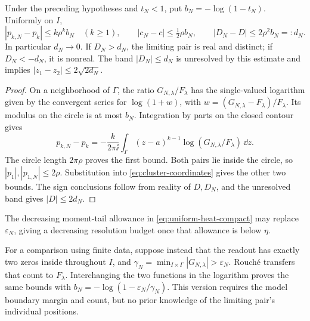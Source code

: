\begin{proposition}
\label{prop:pair-resolution}
Under the preceding hypotheses and \(t_N<1\), put
\(b_N=-\log(1-t_N)\). Uniformly on \(I\),
\begin{equation}
 |p_{k,N}-p_k|\le k\rho^k b_N\quad(k\ge1),\qquad
 |c_N-c|\le\tfrac12\rho b_N,\qquad
 |D_N-D|\le 2\rho^2 b_N=:d_N.
 \label{eq:pair-resolution}
\end{equation}
In particular \(d_N\to0\). If \(D_N>d_N\), the limiting pair is
real and distinct; if \(D_N<-d_N\), it is nonreal. The band
\(|D_N|\le d_N\) is unresolved by this estimate and implies
\(|z_1-z_2|\le2\sqrt{2d_N}\).
\end{proposition}
\begin{proof}
On a neighborhood of \(\Gamma\), the ratio \(G_{N,\lambda}/F_\lambda\)
has the single-valued logarithm given by the convergent series for
\(\log(1+w)\), with \(w=(G_{N,\lambda}-F_\lambda)/F_\lambda\).
Its modulus on the circle is at most \(b_N\). Integration by parts
on the closed contour gives
\[
 p_{k,N}-p_k=-\frac{k}{2\pi\ii}\int_\Gamma
          (z-a)^{k-1}\log(G_{N,\lambda}/F_\lambda)\,\dd z.
\]
The circle length \(2\pi\rho\) proves the first bound. Both pairs
lie inside the circle, so \(|p_1|,|p_{1,N}|\le2\rho\).
Substitution into \eqref{eq:cluster-coordinates} gives the other two
bounds. The sign conclusions follow from reality of \(D,D_N\), and
the unresolved band gives \(|D|\le2d_N\).
\end{proof}

The decreasing moment-tail allowance in \eqref{eq:uniform-heat-compact}
may replace \(\varepsilon_N\), giving a decreasing resolution budget
once that allowance is below \(\eta\).

For a comparison using finite data, suppose instead that the readout
has exactly two zeros inside throughout \(I\), and
\(\gamma_N=\min_{I\times\Gamma}|G_{N,\lambda}|>\varepsilon_N\).
Rouch\'e transfers that count to \(F_\lambda\). Interchanging the
two functions in the logarithm proves the same bounds with
\(b_N=-\log(1-\varepsilon_N/\gamma_N)\). This version requires
the model boundary margin and count, but no prior knowledge of the
limiting pair's individual positions.

